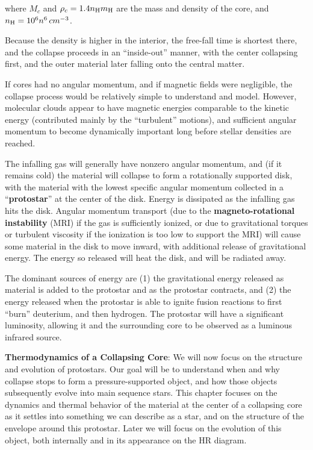 \documentclass[a4paper,10pt]{article}
\begin{document}
{\noindent}where $M_c$ and $\rho_c=1.4n_{\rm H}m_{\rm H}$ are the mass and density of the core, and $n_{\rm H}=10^6n^6\,{cm^{-3}}$.

{\noindent}Because the density is higher in the interior, the free-fall time is shortest there, and the collapse proceeds in an ``inside-out'' manner, with the center collapsing first, and the outer material later falling onto the central matter.

{\noindent}If cores had no angular momentum, and if magnetic fields were negligible, the collapse process would be relatively simple to understand and model. However, molecular clouds appear to have magnetic energies comparable to the kinetic energy (contributed mainly by the ``turbulent'' motions), and sufficient angular momentum to become dynamically important long
before stellar densities are reached. 

{\noindent}The infalling gas will generally have nonzero angular momentum, and (if it remains cold) the material will collapse to form a rotationally supported disk, with the material with the lowest specific angular momentum collected in a ``\textbf{protostar}'' at the center of the disk. Energy is dissipated as the infalling gas hits the disk. Angular momentum transport (due to the \textbf{magneto-rotational instability} (MRI) if the gas is sufficiently ionized, or due to gravitational torques or turbulent viscosity if the ionization is too low to support the MRI) will cause some material in the disk to move inward, with additional release of gravitational energy. The energy so released will heat the disk, and will be radiated away.

{\noindent}The dominant sources of energy are (1) the gravitational energy released as material is added to the protostar and as the protostar contracts, and (2) the energy released when the protostar is able to ignite fusion reactions to first ``burn'' deuterium, and then hydrogen. The protostar will have a significant luminosity, allowing it and the surrounding core to be observed as a luminous infrared source.

{\noindent}\textbf{Thermodynamics of a Collapsing Core}: We will now focus on the structure and evolution of protostars. Our goal will be to understand when and why collapse stops to form a pressure-supported object, and how those objects subsequently evolve into main sequence stars. This chapter focuses on
the dynamics and thermal behavior of the material at the center of a collapsing core as it settles into something we can describe as a star, and on the structure of the envelope around this protostar. Later we will focus on the evolution of this object, both internally and in its appearance on the HR diagram.
\end{document}
